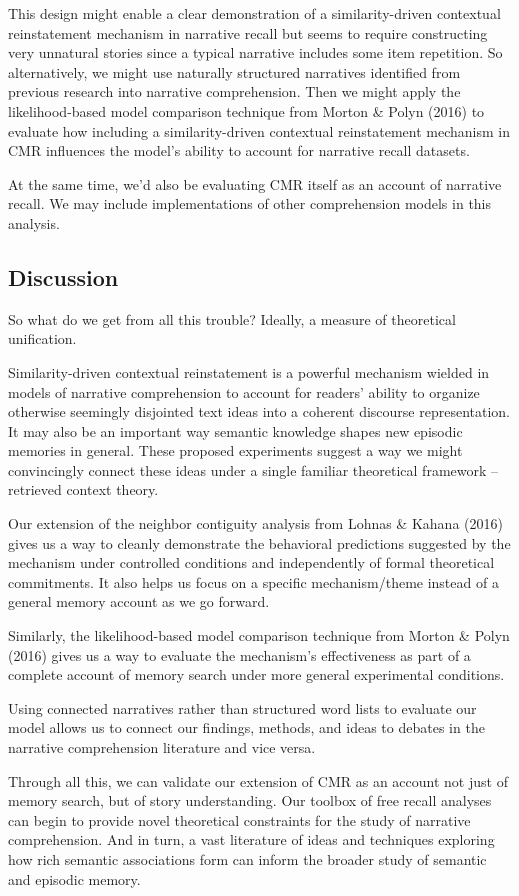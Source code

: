 \documentclass[
  english,
  11pt,
  letterpaper,
]{article}
\begin{document}
This design might enable a clear demonstration of a similarity-driven
contextual reinstatement mechanism in narrative recall but seems to
require constructing very unnatural stories since a typical narrative
includes some item repetition. So alternatively, we might use naturally
structured narratives identified from previous research into narrative
comprehension. Then we might apply the likelihood-based model comparison
technique from Morton \& Polyn (2016) to evaluate how including a
similarity-driven contextual reinstatement mechanism in CMR influences
the model's ability to account for narrative recall datasets.

At the same time, we'd also be evaluating CMR itself as an account of
narrative recall. We may include implementations of other comprehension
models in this analysis.

\subsection{Discussion}\label{discussion}

So what do we get from all this trouble? Ideally, a measure of
theoretical unification.

Similarity-driven contextual reinstatement is a powerful mechanism
wielded in models of narrative comprehension to account for readers'
ability to organize otherwise seemingly disjointed text ideas into a
coherent discourse representation. It may also be an important way
semantic knowledge shapes new episodic memories in general. These
proposed experiments suggest a way we might convincingly connect these
ideas under a single familiar theoretical framework -- retrieved context
theory.

Our extension of the neighbor contiguity analysis from Lohnas \& Kahana
(2016) gives us a way to cleanly demonstrate the behavioral predictions
suggested by the mechanism under controlled conditions and independently
of formal theoretical commitments. It also helps us focus on a specific
mechanism/theme instead of a general memory account as we go forward.

Similarly, the likelihood-based model comparison technique from Morton
\& Polyn (2016) gives us a way to evaluate the mechanism's effectiveness
as part of a complete account of memory search under more general
experimental conditions.

Using connected narratives rather than structured word lists to evaluate
our model allows us to connect our findings, methods, and ideas to
debates in the narrative comprehension literature and vice versa.

Through all this, we can validate our extension of CMR as an account not
just of memory search, but of story understanding. Our toolbox of free
recall analyses can begin to provide novel theoretical constraints for
the study of narrative comprehension. And in turn, a vast literature of
ideas and techniques exploring how rich semantic associations form can
inform the broader study of semantic and episodic memory.
\end{document}
